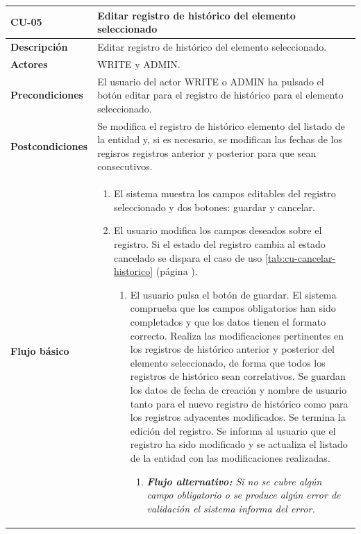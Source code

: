 \begin{table} [H]
    \centering
    \setlength{\leftmargini}{0.4cm}
	\resizebox{14cm}{!} { %
    \begin{tabular}{| m{3cm} | m{11cm} |}   
    \hline
	  \textbf{CU-05} & \textbf{Editar registro de histórico del elemento seleccionado} \\\hline
	  \textbf{Descripción} & Editar registro de histórico del elemento seleccionado. \\\hline
	  \textbf{Actores} & WRITE y ADMIN. \\\hline
	  \textbf{Precondiciones} & El usuario del actor WRITE o ADMIN ha pulsado el botón editar para el registro de histórico para el elemento seleccionado. \\\hline
	  \textbf{Postcondiciones} & Se modifica el registro de histórico elemento del listado de la entidad  y, si es necesario, se modifican las fechas de los regisros registros anterior y posterior para que sean consecutivos. \\\hline
	  \textbf{Flujo básico} & 
		\begin{enumerate}
	  	\item El sistema muestra los campos editables del registro seleccionado y dos botones: guardar y cancelar.
        \item El usuario modifica los campos deseados sobre el registro. Si el estado del registro cambia al estado cancelado se dispara el caso de uso \ref{tab:cu-cancelar-historico} (página \pageref{tab:cu-cancelar-historico}).
			\begin{enumerate}	
			   \item El usuario pulsa el botón de guardar. El sistema comprueba que los campos obligatorios han sido completados y que los datos tienen el formato correcto. Realiza las modificaciones pertinentes en los registros de histórico anterior y posterior del elemento seleccionado, de forma que todos los registros de histórico sean correlativos. Se guardan los datos de fecha de creación y nombre de usuario tanto para el nuevo registro de histórico como para los registros adyacentes modificados. Se termina la edición del registro. Se informa al usuario que el registro ha sido modificado y se actualiza el listado de la entidad con las modificaciones realizadas.
			   \begin{enumerate}	
			   \item  \textit{\textbf{Flujo alternativo:} Si no se cubre algún campo obligatorio o se produce algún error de validación el sistema informa del error.}

\end{enumerate}
\end{enumerate}
\end{enumerate}
\end{tabular}}
\end{table}
